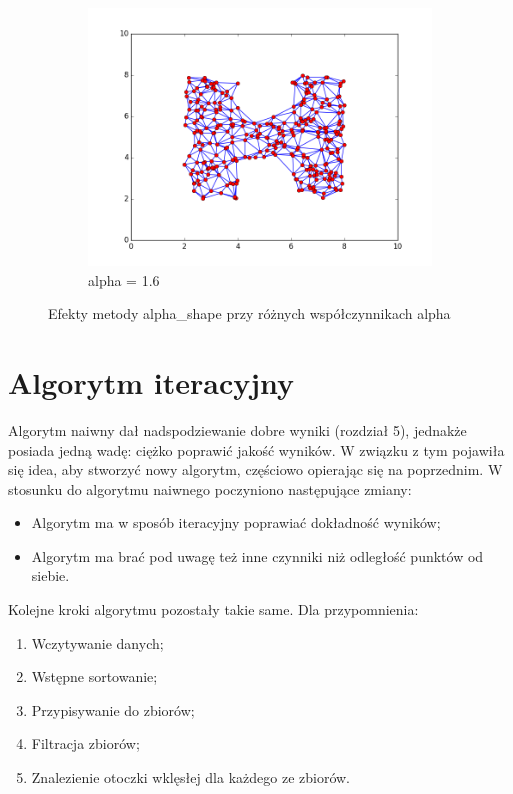 \begin{figure}[h!]
\begin{subfigure}[b]{0.33\textwidth}
		\includegraphics[width=\linewidth]{img/triangulacja3.png}
		\caption {alpha = 1.6}
	\end{subfigure}
    \caption{Efekty metody alpha\_shape przy różnych współczynnikach alpha}
    \label{fig:triangulacja_alpha}
\end{figure}

\section{Algorytm iteracyjny}

Algorytm naiwny dał nadspodziewanie dobre wyniki (rozdział 5), jednakże posiada jedną wadę:
ciężko poprawić jakość wyników. W związku z tym pojawiła się idea, aby stworzyć nowy algorytm, częściowo
opierając się na poprzednim. W stosunku do algorytmu naiwnego poczyniono następujące zmiany:
\begin{itemize}
    \item Algorytm ma w sposób iteracyjny poprawiać dokładność wyników;
    \item Algorytm ma brać pod uwagę też inne czynniki niż odległość punktów od siebie.
\end{itemize}

\noindent Kolejne kroki algorytmu pozostały takie same. Dla przypomnienia:
\begin{enumerate}
    \item Wczytywanie danych;
    \item Wstępne sortowanie;
    \item Przypisywanie do zbiorów;
    \item Filtracja zbiorów;
    \item Znalezienie otoczki wklęsłej dla każdego ze zbiorów.
\end{enumerate}

